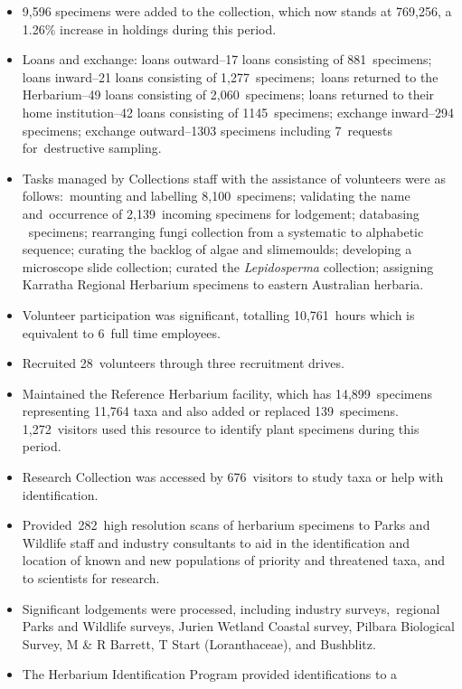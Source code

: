 \documentclass[version=last,
    paper=a4, %
    10pt, %
    usenames,
    dvipsnames,
    oneside, %
    headings=openany, %
    DIV=15 %
]{scrbook}
\begin{document}
\begin{itemize}
\itemsep1pt\parskip0pt
\item
  9,596 specimens were added to the collection, which now stands at
  769,256, a 1.26\% increase in holdings during this period.
\item
  Loans and exchange: loans outward--17 loans consisting of
  881~specimens; loans inward--21 loans consisting of
  1,277~specimens;~loans returned to the Herbarium--49 loans consisting
  of 2,060~specimens; loans returned to their home institution--42 loans
  consisting of 1145~specimens; exchange inward--294 specimens; exchange
  outward--1303 specimens including 7~requests for~destructive sampling.
\item
  Tasks managed by Collections staff with the assistance of volunteers
  were as follows:~mounting and labelling 8,100~specimens; validating
  the name and~occurrence of 2,139~incoming specimens for lodgement;
  databasing ~specimens; rearranging fungi collection from a systematic
  to alphabetic sequence; curating the backlog of algae and slimemoulds;
  developing a microscope slide collection; curated the
  \emph{Lepidosperma} collection; assigning Karratha Regional Herbarium
  specimens to eastern Australian herbaria.
\item
  Volunteer participation was significant, totalling 10,761~hours which
  is equivalent to 6~full time employees.
\item
  Recruited 28~volunteers through three recruitment drives.
\item
  Maintained the Reference Herbarium facility, which has
  14,899~specimens representing 11,764 taxa and also added or replaced
  139~specimens. 1,272~visitors used this resource to identify plant
  specimens during this period.~
\item
  Research Collection was accessed by 676~visitors to study taxa or help
  with identification.
\item
  Provided~282~high resolution scans of herbarium specimens to Parks and
  Wildlife staff and industry consultants to aid in the identification
  and location of known and new populations of priority and threatened
  taxa, and to scientists for research.
\item
  Significant lodgements were processed, including industry
  surveys,~regional Parks and Wildlife surveys, Jurien Wetland Coastal
  survey, Pilbara Biological Survey, M \& R Barrett, T Start
  (Loranthaceae), and Bushblitz.
\item
  The Herbarium Identification Program provided identifications to a

\end{itemize}
\end{document}

